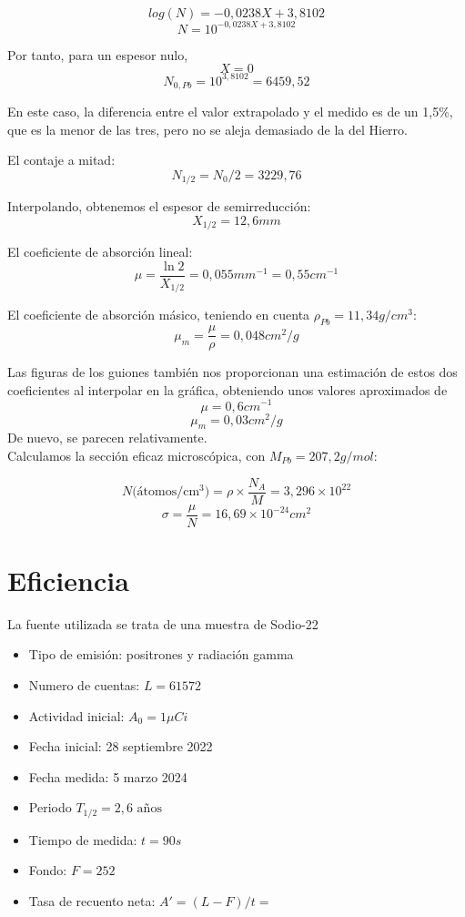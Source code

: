 \documentclass[a4paper,12pt,spanish]{article}
\begin{document}
	
	
	\[ log(N) = -0,0238 X + 3,8102
	\]
	\[ N = 10^{-0,0238 X + 3,8102}
	\]
	
	Por tanto, para un espesor nulo,
	\[ X = 0
	\]
	\[N_{0, Pb} = 10^{3,8102} = 6459,52  \]
	
	En este caso, la diferencia entre el valor extrapolado y el medido es de un 1,5\%, que es la menor de las tres, pero no se aleja demasiado de la del Hierro.
	
	
	
	El contaje a mitad:
	\[N_{1/2} = N_0 /2 = 3229,76
	\]
		
	Interpolando, obtenemos el espesor de semirreducción:
	\[ X_{1/2} = 12,6\si{mm}
	\]
	
	El coeficiente de absorción lineal:
	\[ \mu = \frac{\ln 2}{X_{1/2}} = 0,055\si{mm^{-1}} = 0,55\si{cm^{-1}}
	\]
	
	El coeficiente de absorción másico, teniendo en cuenta $\rho_{Pb} = 11,34\si{g/cm^3}$:
	\[ \mu_m = \frac{\mu}{\rho} = 0,048\si{cm^2/g}
	\]
	
	Las figuras de los guiones también nos proporcionan una estimación de estos dos coeficientes al interpolar en la gráfica, obteniendo unos valores aproximados de
	\[ \mu = 0,6\si{cm^{-1}}
	\]
	\[ \mu_m = 0,03 \si{cm^2/g}
	\]
	De nuevo, se parecen relativamente.\\ 
	
	
	Calculamos la sección eficaz microscópica, con $M_{Pb}= 207,2\si{g/mol}$:
	
	\[ N \text{(átomos/cm$^3$)} = \rho \times \frac{N_A}{M} = 3,296\times 10^{22}
	\]
	\[ \sigma = \frac{\mu}{N} = 16,69\times10^{-24} \si{cm^2}
	\]
	
	
	
	
	
	\section{Eficiencia}
	
	
	La fuente utilizada se trata de una muestra de Sodio-22
	\begin{itemize}
		\item Tipo de emisión: positrones y radiación gamma
		\item Numero de cuentas: $L = 61572$
		\item Actividad inicial: $A_0 = 1\si{\mu Ci}$
		\item Fecha inicial: 28 septiembre 2022
		\item Fecha medida: 5 marzo 2024
		\item Periodo $T_{1/2} = 2,6 \text{ años}$ 
		\item Tiempo de medida: $t = 90\si{s}$
		\item Fondo: $F = 252$
		
		\item Tasa de recuento neta: $A' = (L-F)/t = $
	\end{itemize}
	
\end{document}

